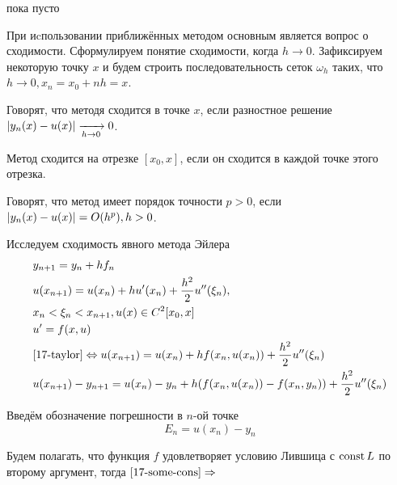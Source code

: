  \begin{col-answer-preambule}
	\begin{plan}
    \item пока пусто
	\end{plan}
\end{col-answer-preambule}


При иcпользовании приближённых методом основным является вопрос о сходимости.
Сформулируем понятие сходимости, когда $h \to 0$. Зафиксируем некоторую точку
$x$ и будем строить последовательность сеток $\omega_h$ таких, что $h \to 0,
x_n = x_0 + nh = x$.

\begin{definition}
  Говорят, что методя сходится в точке $x$, если разностное решение
  $\left\lvert y_n(x) - u(x) \right\rvert \xrightarrow[h \to 0]{} 0$.
\end{definition}

\begin{definition}
  Метод сходится на отрезке $[x_0, x]$, если он сходится в каждой точке этого
  отрезка.
\end{definition}

\begin{definition}
  Говорят, что метод имеет порядок точности $p > 0$, если $\left\lvert y_n(x) - u(x) \right\rvert
  = O(h^p), h > 0$.
\end{definition}

Исследуем сходимость явного метода Эйлера
\begin{align}
  &y_{n + 1} = y_n + hf_n\\
  \label{17-taylor}
  &u(x_{n + 1}) = u(x_n) + hu'(x_n) + \dfrac{h^2}{2}u''(\xi_n),\\
  \nonumber
  &x_n < \xi_n < x_{n + 1}, u(x) \in C^2[x_0, x]\\
  &u' = f(x, u)\\
  &\eqref{17-taylor} \Leftrightarrow u(x_{n + 1}) = u(x_n) + hf(x_n, u(x_n)) +
  \dfrac{h^2}{2}u''(\xi_n)\\
  \label{17-some-cons}
  &u(x_{n + 1}) - y_{n + 1} = u(x_n) - y_n + h(f(x_n, u(x_n)) - f(x_n, y_n)) +
  \dfrac{h^2}{2}u''(\xi_n)
\end{align}

Введём обозначение погрешности в $n$-ой точке
\begin{equation}
  E_n = u(x_n) - y_n
\end{equation}

Будем полагать, что функция $f$ удовлетворяет условию Лившица с $\operatorname{\text{const}} L$ по
второму аргумент, тогда $\eqref{17-some-cons} \Rightarrow$

